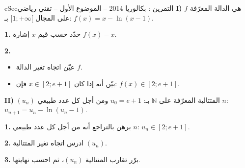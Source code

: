 \documentclass[12pt,a4paper]{article}
\newenvironment{BOX}[2]{\begin{otherlanguage}{english}\begin{arbox}{#1}{#2}}{\end{arbox}\end{otherlanguage}}
\newcounter{exo}
\newenvironment{tamrin}[1]{\stepcounter{exo}\begin{BOX}{cSec}{التمرين \theexo: #1}}{\end{BOX}}
\newcommand{\N}{\mathbb{N}}
\newenvironment{sq}{\begin{itemize}[leftmargin=2.4em,itemsep=3pt]}{\end{itemize}}
\newcommand{\qa}{\item[(أ)]}\newcommand{\qb}{\item[(ب)]}\newcommand{\qc}{\item[(جـ)]}\newcommand{\qd}{\item[(د)]}\newcommand{\qe}{\item[(هـ)]}
\newcommand{\QQ}[1]{\par\smallskip\textbf{#1.} }
\begin{document}
\begin{tamrin}{بكالوريا 2014 -- الموضوع الأول -- تقني رياضي}
\textbf{I)} $f$ هي الدالة المعرّفة على المجال $]1;+\infty[$ بـ: $f(x)=x-\ln(x-1)$.

\QQ{1} حدّد حسب قيم $x$ إشارة $f(x)-x$.

\QQ{2}
\begin{sq}
\qa عيّن اتجاه تغير الدالة $f$.
\qb بيّن أنه إذا كان $x\in[2;e+1]$ فإن: $f(x)\in[2;e+1]$.
\end{sq}

\textbf{II)} $(u_n)$ المتتالية المعرّفة على $\N$ بـ: $u_0=e+1$ ومن أجل كل عدد طبيعي $n$: $u_{n+1}=u_n-\ln(u_n-1)$.

\QQ{1} برهن بالتراجع أنه من أجل كل عدد طبيعي $n$: $u_n\in[2;e+1]$.

\QQ{2} ادرس اتجاه تغير المتتالية $(u_n)$.

\QQ{3} برّر تقارب المتتالية $(u_n)$، ثم احسب نهايتها.
\end{tamrin}
\end{document}
